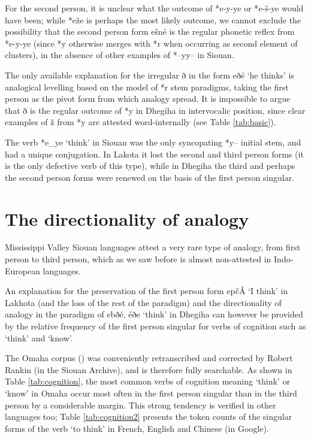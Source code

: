 \documentclass[oldfontcommands,oneside,a4paper,11pt]{article}
\newcommand{\ipa}[1]{{\phon#1}} %
\begin{document}
 
 For the second person, it is unclear what the outcome of *\ipa{e-y-ye} or *\ipa{e-š-ye} would have been; while  *\ipa{eže}  is perhaps the most likely outcome, we cannot exclude the possibility that the second person form  \ipa{ešné} is the regular phonetic reflex from  *\ipa{e-y-ye} (since *\ipa{y} otherwise merges with *\ipa{r} when occurring as second element of clusters), in the absence of other examples of *\ipa{--yy--} in Siouan.

The only available explanation for the irregular \ipa{ð} in the form \ipa{eðé} `he thinks' is analogical levelling based on the model of *\ipa{r} stem paradigms, taking the first person as the pivot form from which analogy spread. It is impossible to argue that \ipa{ð} is the regular outcome of *\ipa{y} in Dhegiha in intervocalic position, since clear examples of \ipa{ž} from *\ipa{y} are attested word-internally (see Table \ref{tab:basic}).

The verb *\ipa{e\_ye} `think' in Siouan was the only syncopating *\ipa{y--} initial stem, and had a unique conjugation. In Lakota it lost the second and third person forms (it is the only defective verb of this type), while in Dhegiha the third and perhaps the second person forms were renewed on the basis of the first person singular.


\section{The directionality of analogy}

Mississippi Valley Siouan languages attest  a very rare type of analogy, from first person to third person, which as we saw before is almost non-attested in Indo-European languages.

An explanation for the preservation of the first person form \ipa{epčÁ} `I think' in Lakhota (and the loss of the rest of the paradigm) and the directionality of analogy in the paradigm of \ipa{ebðé}, \ipa{éðe} `think' in Dhegiha can however be provided by the relative frequency of the first person singular for verbs of cognition such as   `think' and `know'.

The Omaha corpus (\citealt{dorsey1890cegiha}) was conveniently retranscribed and corrected by Robert Rankin (in the Siouan Archive), and is therefore fully searchable. As shown in Table \ref{tab:cognition}, the most common  verbs of cognition meaning `think' or `know' in Omaha occur most often in the first person singular than in the third person by a considerable margin. This strong tendency is verified in other languages too; Table \ref{tab:cognition2} presents the token counts of the singular forms of the verb `to think' in French, English and Chinese (in Google).
\end{document}
